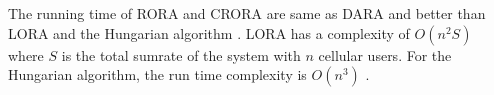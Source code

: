 \documentclass[times]{dacauth}
\begin{document}
\noindent
The running time of RORA and CRORA are same as DARA \cite{dara} and better than LORA \cite{lora} and the Hungarian algorithm \cite{hungarian}. LORA has a complexity of  $O(n^2S)$ where $S$ is the total sumrate of the system with $n$ cellular users. For the Hungarian algorithm, the run time complexity is  $O(n^3)$ .  





\end{document}
